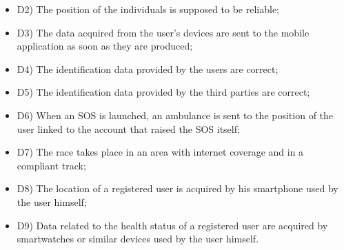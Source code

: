 \documentclass{article}
\begin{document}
\begin{legal}
\begin{legal}
\begin{legal}
{\begin{itemize}
				\item D2) The position of the individuals is supposed to be reliable;\\
				\item D3) The data acquired from the user’s devices are sent to the mobile application as soon as they are produced;\\
				\item D4) The identification data provided by the users are correct;\\
				\item D5) The identification data provided by the third parties are correct;\\
				\item D6) When an SOS is launched, an ambulance is sent to the position of the user linked to the account that raised the SOS itself;\\
				\item D7) The race takes place in an area with internet coverage and in a compliant track;\\
				\item D8) The location of a registered user is acquired by his smartphone used by the user himself;\\
				\item D9) Data related to the health status of a registered user are acquired by smartwatches or similar devices used by the user himself.\\
				\end{itemize}
			}
			\end{legal}
		\end{legal}
	

\end{legal}
\end{document}

